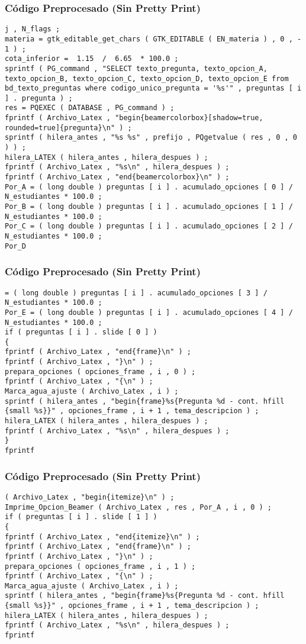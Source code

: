 \documentclass{beamer}
\begin{document}
\begin{frame}[fragile]
\frametitle{C\'odigo Preprocesado (Sin Pretty Print)}
\begin{lstlisting}[style=CStyle]
j , N_flags ; 
materia = gtk_editable_get_chars ( GTK_EDITABLE ( EN_materia ) , 0 , - 1 ) ; 
cota_inferior =  1.15  /  6.65  * 100.0 ; 
sprintf ( PG_command , "SELECT texto_pregunta, texto_opcion_A, texto_opcion_B, texto_opcion_C, texto_opcion_D, texto_opcion_E from bd_texto_preguntas where codigo_unico_pregunta = '%s'" , preguntas [ i ] . pregunta ) ; 
res = PQEXEC ( DATABASE , PG_command ) ; 
fprintf ( Archivo_Latex , "begin{beamercolorbox}[shadow=true, rounded=true]{pregunta}\n" ) ; 
sprintf ( hilera_antes , "%s %s" , prefijo , PQgetvalue ( res , 0 , 0 ) ) ; 
hilera_LATEX ( hilera_antes , hilera_despues ) ; 
fprintf ( Archivo_Latex , "%s\n" , hilera_despues ) ; 
fprintf ( Archivo_Latex , "end{beamercolorbox}\n" ) ; 
Por_A = ( long double ) preguntas [ i ] . acumulado_opciones [ 0 ] / N_estudiantes * 100.0 ; 
Por_B = ( long double ) preguntas [ i ] . acumulado_opciones [ 1 ] / N_estudiantes * 100.0 ; 
Por_C = ( long double ) preguntas [ i ] . acumulado_opciones [ 2 ] / N_estudiantes * 100.0 ; 
Por_D \end{lstlisting}
\end{frame}
\begin{frame}[fragile]
\frametitle{C\'odigo Preprocesado (Sin Pretty Print)}
\begin{lstlisting}[style=CStyle]
= ( long double ) preguntas [ i ] . acumulado_opciones [ 3 ] / N_estudiantes * 100.0 ; 
Por_E = ( long double ) preguntas [ i ] . acumulado_opciones [ 4 ] / N_estudiantes * 100.0 ; 
if ( preguntas [ i ] . slide [ 0 ] ) 
{ 
fprintf ( Archivo_Latex , "end{frame}\n" ) ; 
fprintf ( Archivo_Latex , "}\n" ) ; 
prepara_opciones ( opciones_frame , i , 0 ) ; 
fprintf ( Archivo_Latex , "{\n" ) ; 
Marca_agua_ajuste ( Archivo_Latex , i ) ; 
sprintf ( hilera_antes , "begin{frame}%s{Pregunta %d - cont. hfill {small %s}}" , opciones_frame , i + 1 , tema_descripcion ) ; 
hilera_LATEX ( hilera_antes , hilera_despues ) ; 
fprintf ( Archivo_Latex , "%s\n" , hilera_despues ) ; 
} 
fprintf \end{lstlisting}
\end{frame}
\begin{frame}[fragile]
\frametitle{C\'odigo Preprocesado (Sin Pretty Print)}
\begin{lstlisting}[style=CStyle]
( Archivo_Latex , "begin{itemize}\n" ) ; 
Imprime_Opcion_Beamer ( Archivo_Latex , res , Por_A , i , 0 ) ; 
if ( preguntas [ i ] . slide [ 1 ] ) 
{ 
fprintf ( Archivo_Latex , "end{itemize}\n" ) ; 
fprintf ( Archivo_Latex , "end{frame}\n" ) ; 
fprintf ( Archivo_Latex , "}\n" ) ; 
prepara_opciones ( opciones_frame , i , 1 ) ; 
fprintf ( Archivo_Latex , "{\n" ) ; 
Marca_agua_ajuste ( Archivo_Latex , i ) ; 
sprintf ( hilera_antes , "begin{frame}%s{Pregunta %d - cont. hfill {small %s}}" , opciones_frame , i + 1 , tema_descripcion ) ; 
hilera_LATEX ( hilera_antes , hilera_despues ) ; 
fprintf ( Archivo_Latex , "%s\n" , hilera_despues ) ; 
fprintf \end{lstlisting}
\end{frame}
\end{document}
